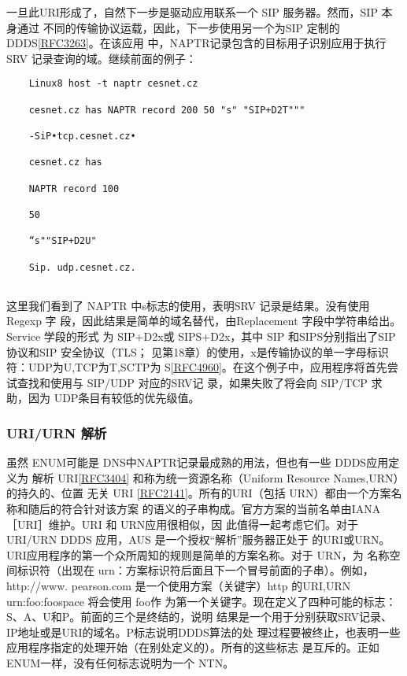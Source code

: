一旦此URI形成了，自然下一步是驱动应用联系一个 SIP 服务器。然而，SIP 本身通过
不同的传输协议运载，因此，下一步使用另一个为SIP 定制的DDDS\href{https://www.rfc-editor.org/rfc/rfc3263}{[RFC3263]}。在该应用
中，NAPTR记录包含的目标用子识别应用于执行SRV 记录查询的域。继续前面的例子：

\begin{verbatim}
    Linux8 host -t naptr cesnet.cz
    
    cesnet.cz has NAPTR record 200 50 "s" "SIP+D2T"""
    
    -SiP•tcp.cesnet.cz•
    
    cesnet.cz has
    
    NAPTR record 100
    
    50
    
    “s""SIP+D2U"
    
    Sip. udp.cesnet.cz.
    
\end{verbatim}

这里我们看到了 NAPTR 中s标志的使用，表明SRV 记录是结果。没有使用 Regexp 字
段，因此结果是简单的域名替代，由Replacement 字段中学符串给出。Service 学段的形式
为 SIP+D2x或 SIPS+D2x，其中 SIP 和SIPS分别指出了SIP 协议和SIP 安全协议（TLS；
见第18章）的使用，x是传输协议的单一字母标识符：UDP为U,TCP为T,SCTP为
S\href{https://www.rfc-editor.org/rfc/rfc4960}{[RFC4960]}。在这个例子中，应用程序将首先尝试查找和使用与 SIP/UDP 对应的SRV记
录，如果失败了将会向 SIP/TCP 求助，因为 UDP条目有较低的优先级值。

\subsubsection{ URI/URN 解析}

虽然 ENUM可能是 DNS中NAPTR记录最成熟的用法，但也有一些 DDDS应用定义为
解析 URI\href{https://www.rfc-editor.org/rfc/rfc3404}{[RFC3404]} 和称为统一资源名称（Uniform Resource Names,URN）的持久的、位置
无关 URI \href{https://www.rfc-editor.org/rfc/rfc2141}{[RFC2141]}。所有的URI（包括 URN）都由一个方案名称和随后的符合针对该方案
的语义的子串构成。官方方案的当前名单由IANA［URI］维护。URI 和 URN应用很相似，因
此值得一起考虑它们。对于 URI/URN DDDS 应用，AUS 是一个授权“解析”服务器正处于
的URI或URN。URI应用程序的第一个众所周知的规则是简单的方案名称。对于 URN，为
名称空间标识符（出现在 urn：方案标识符后面且下一个冒号前面的子串）。例如，http://www.
pearson.com 是一个使用方案（关键字）http 的URI,URN urn:foo:foospace 将会使用 foo作
为第一个关键字。现在定义了四种可能的标志：S、A、U和P。前面的三个是终结的，说明
结果是一个用于分别获取SRV记录、IP地址或是URI的域名。P标志说明DDDS算法的处
理过程要被终止，也表明一些应用程序指定的处理开始（在别处定义的）。所有的这些标志
是互斥的。正如 ENUM一样，没有任何标志说明为一个 NTN。

